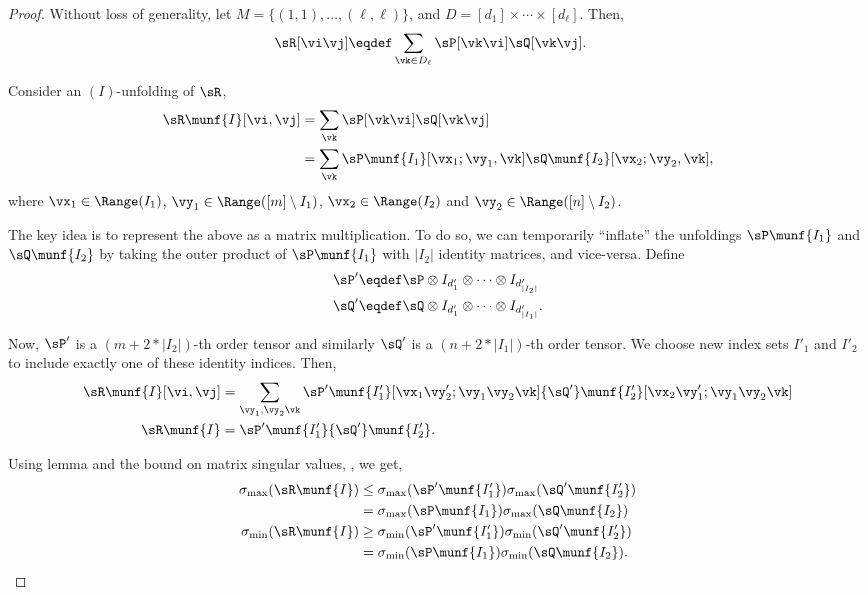 \begin{proof}
  Without loss of generality, let $M = \{(1,1), \ldots, (\ell,\ell)\}$,
  and $D = [d_1] \times \cdots \times [d_\ell]$. 
  Then,
  \begin{align*}
    \sR[\vi\vj] &\eqdef \sum_{\vk \in D_\ell} \sP[\vk \vi] \sQ[\vk \vj].
  \end{align*}

Consider an $(I)$-unfolding of $\sR$,
  \begin{align*}
    \sR\munf{I}[\vi,\vj] 
       &= \sum_{\vk} \sP[\vk \vi] \sQ[\vk \vj] \\
       &= \sum_{\vk} \sP\munf{I_1}[\vx_1; \vy_1, \vk] \sQ\munf{I_2}[\vx_2; \vy_2, \vk],
  \end{align*}
  where $\vx_1 \in \Range(I_1)$, $\vy_1 \in \Range([m] \setminus I_1)$, $\vx_2 \in \Range(I_2)$ and $\vy_2  \in \Range([n] \setminus I_2)$.

The key idea is to represent the above as a matrix multiplication.
To do so, we can temporarily ``inflate'' the unfoldings $\sP\munf{I_1}$
  and $\sQ\munf{I_2}$ by taking the outer product of $\sP\munf{I_1}$ with
  $|I_2|$ identity matrices, and vice-versa. Define 
\begin{align*}
  \sP' &\eqdef \sP \otimes I_{d'_1} \otimes \cdots \otimes I_{d'_{|I_2|}} \\
  \sQ' &\eqdef \sQ \otimes I_{d'_1} \otimes \cdots \otimes I_{d'_{|I_1|}}.
\end{align*}

Now, $\sP'$ is a $(m + 2 * |I_2|)$-th order tensor and similarly $\sQ'$
  is a $(n + 2 * |I_1|)$-th order tensor. We choose new index sets
  $I'_1$ and $I'_2$ to include exactly one of these identity indices. 
Then,
\begin{align*}
    \sR\munf{I}[\vi,\vj] 
    &= \sum_{\vy_1, \vy_2 \vk}
    {\sP'}\munf{I'_1}[\vx_1\vy'_2; \vy_1 \vy_2 \vk]  
    {\sQ'}\munf{I'_2}[\vx_2\vy'_1; \vy_1 \vy_2 \vk] \\
    \sR\munf{I} &= {\sP'}\munf{I'_1} {\sQ'}\munf{I'_2}.
\end{align*}

Using lemma  and the bound on matrix singular
values, , we get,
\begin{align*}
\sigma_{\max}(\sR\munf{I}) 
    &\le \sigma_{\max}({\sP'}\munf{I'_1}) \sigma_{\max}({\sQ'}\munf{I'_2}) \\
      &= \sigma_{\max}(\sP\munf{I_1}) \sigma_{\max}(\sQ\munf{I_2}) \\
    \sigma_{\min}(\sR\munf{I})  
    &\ge \sigma_{\min}({\sP'}\munf{I'_1}) \sigma_{\min}({\sQ'}\munf{I'_2}) \\
      &= \sigma_{\min}(\sP\munf{I_1}) \sigma_{\min}(\sQ\munf{I_2}).
\end{align*}
\end{proof}


